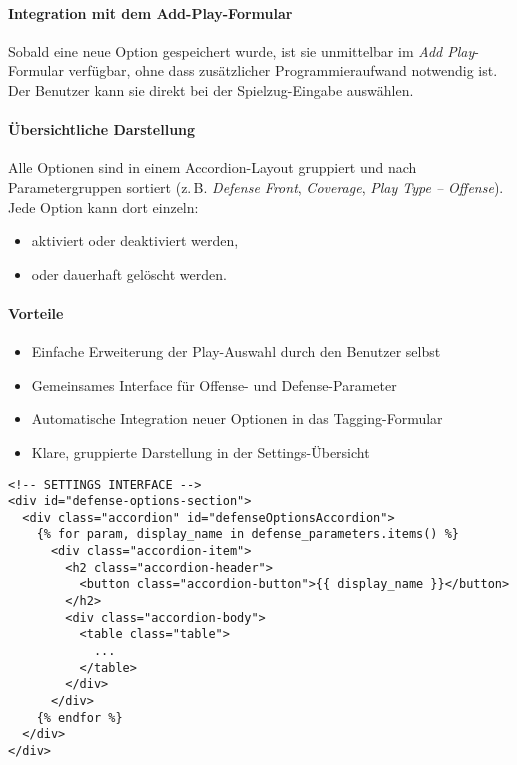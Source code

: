 \paragraph{Integration mit dem Add-Play-Formular}%
Sobald eine neue Option gespeichert wurde, ist sie unmittelbar im \textit{Add Play}-Formular verfügbar, ohne dass zusätzlicher Programmieraufwand notwendig ist. Der Benutzer kann sie direkt bei der Spielzug-Eingabe auswählen.

\paragraph{Übersichtliche Darstellung}%
Alle Optionen sind in einem Accordion-Layout gruppiert und nach Parametergruppen sortiert (z.\,B. \textit{Defense Front}, \textit{Coverage}, \textit{Play Type – Offense}). Jede Option kann dort einzeln:
\begin{itemize}
  \item aktiviert oder deaktiviert werden,
  \item oder dauerhaft gelöscht werden.
\end{itemize}

\paragraph{Vorteile}%
\begin{itemize}
  \item Einfache Erweiterung der Play-Auswahl durch den Benutzer selbst
  \item Gemeinsames Interface für Offense- und Defense-Parameter
  \item Automatische Integration neuer Optionen in das Tagging-Formular
  \item Klare, gruppierte Darstellung in der Settings-Übersicht
\end{itemize}


\begin{verbatim}
<!-- SETTINGS INTERFACE -->
<div id="defense-options-section">
  <div class="accordion" id="defenseOptionsAccordion">
    {% for param, display_name in defense_parameters.items() %}
      <div class="accordion-item">
        <h2 class="accordion-header">
          <button class="accordion-button">{{ display_name }}</button>
        </h2>
        <div class="accordion-body">
          <table class="table">
            ...
          </table>
        </div>
      </div>
    {% endfor %}
  </div>
</div>
\end{verbatim}

